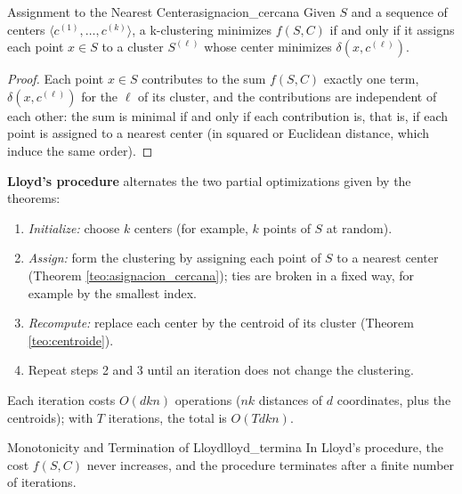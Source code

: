 \documentclass[11pt, a4paper]{article}
\begin{document}
\begin{teorema}{Assignment to the Nearest Center}{asignacion_cercana}
Given $S$ and a sequence of centers $\langle c^{(1)}, \dots, c^{(k)} \rangle$, a k-clustering minimizes $f(S, C)$ if and only if it assigns each point $x \in S$ to a cluster $S^{(\ell)}$ whose center minimizes $\delta(x, c^{(\ell)})$.
\end{teorema}

\begin{proof}
Each point $x \in S$ contributes to the sum $f(S, C)$ exactly one term, $\delta(x, c^{(\ell)})$ for the $\ell$ of its cluster, and the contributions are independent of each other: the sum is minimal if and only if each contribution is, that is, if each point is assigned to a nearest center (in squared or Euclidean distance, which induce the same order).
\end{proof}

\textbf{Lloyd's procedure} alternates the two partial optimizations given by the theorems:
\begin{enumerate}
    \item \textit{Initialize:} choose $k$ centers (for example, $k$ points of $S$ at random).
    \item \textit{Assign:} form the clustering by assigning each point of $S$ to a nearest center (Theorem \ref{teo:asignacion_cercana}); ties are broken in a fixed way, for example by the smallest index.
    \item \textit{Recompute:} replace each center by the centroid of its cluster (Theorem \ref{teo:centroide}).
    \item Repeat steps 2 and 3 until an iteration does not change the clustering.
\end{enumerate}
Each iteration costs $O(dkn)$ operations ($nk$ distances of $d$ coordinates, plus the centroids); with $T$ iterations, the total is $O(T d k n)$.

\begin{proposicion}{Monotonicity and Termination of Lloyd}{lloyd_termina}
In Lloyd's procedure, the cost $f(S, C)$ never increases, and the procedure terminates after a finite number of iterations.
\end{proposicion}
\end{document}
